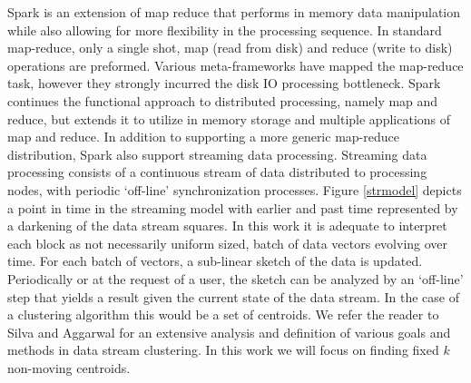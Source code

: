 Spark \cite{chowdhury-10,zaharia-10} is an extension of map reduce that performs in memory data manipulation while also allowing for more flexibility
in the processing sequence.  In standard map-reduce, only a single shot, map (read from disk) and reduce (write to disk)
operations are preformed.  Various meta-frameworks have mapped the map-reduce task, however they strongly incurred the
disk IO processing bottleneck.  Spark continues the functional approach to distributed processing, namely map and
reduce, but extends it to utilize in memory storage and multiple applications of map and reduce.  In addition to
supporting a more generic map-reduce distribution, Spark also support streaming data processing.  Streaming data
processing consists of a continuous stream of data distributed to processing nodes, with periodic `off-line'
synchronization processes.  Figure \ref{strmodel} depicts a point in time in the streaming model with earlier and past
time represented by a darkening of the data stream squares.  In this work it is adequate to interpret each block as not
necessarily uniform sized, batch of data vectors evolving over time.  For each batch of vectors, a sub-linear sketch of
the data is updated.  Periodically or at the request of a user, the sketch can be analyzed by an `off-line' step that
yields a result given the current state of the data stream.  In the case of a clustering algorithm this would be a set
of centroids.  We refer the reader to Silva \cite{silva-13} and Aggarwal \cite{Aggarwal2007} for an extensive analysis
and definition of various goals and methods in data stream clustering.  In this work we will focus on finding fixed $k$
non-moving centroids.
